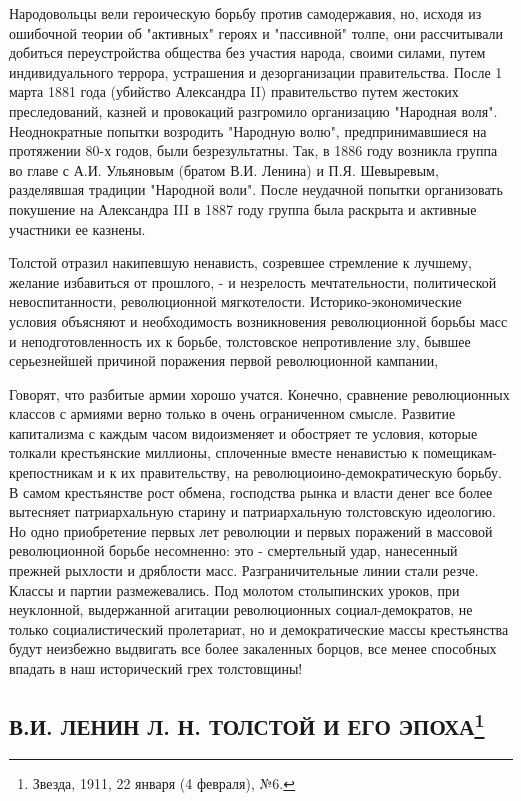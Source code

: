 \documentclass[12pt]{article}
\newcommand{\parnum}{(\arabic{parcount})}
\newcounter{parcount}
\newenvironment{parnumbers}{%
  \par%
  \everypar{\noindent \stepcounter{parcount}\marginpar[]{\parnum}}%
}{}
\begin{document}
\begin{parnumbers}
Народовольцы вели героическую борьбу против самодержавия, но, исходя из ошибочной теории об "активных" героях и "пассивной" толпе, они рассчитывали добиться переустройства общества без участия народа, своими силами, путем индивидуального террора, устрашения и дезорганизации правительства. После 1 марта 1881 года (убийство Александра II) правительство путем жестоких преследований, казней и провокаций разгромило организацию "Народная воля". Неоднократные попытки возродить "Народную волю", предпринимавшиеся на протяжении 80-х годов, были безрезультатны. Так, в 1886 году возникла группа во главе с А.И. Ульяновым (братом В.И. Ленина) и П.Я. Шевыревым, разделявшая традиции "Народной воли". После неудачной попытки организовать покушение на Александра III в 1887 году группа была раскрыта и активные участники ее казнены.

Толстой отразил накипевшую ненависть, созревшее стремление к лучшему, желание избавиться от прошлого, - и незрелость мечтательности, политической невоспитанности, революционной мягкотелости. Историко-экономические условия объясняют и необходимость возникновения революционной борьбы масс и неподготовленность их к борьбе, толстовское непротивление злу, бывшее серьезнейшей причиной поражения первой революционной кампании,

Говорят, что разбитые армии хорошо учатся. Конечно, сравнение революционных классов с армиями верно только в очень ограниченном смысле. Развитие капитализма с каждым часом видоизменяет и обостряет те условия, которые толкали крестьянские миллионы, сплоченные вместе ненавистью к помещикам-крепостникам и к их правительству, на революциоино-демократическую борьбу. В самом крестьянстве рост обмена, господства рынка и власти денег все более вытесняет патриархальную старину и патриархальную толстовскую идеологию. Но одно приобретение первых лет революции и первых поражений в массовой революционной борьбе несомненно: это - смертельный удар, нанесенный прежней рыхлости и дряблости масс. Разграничительные линии стали резче. Классы и партии размежевались. Под молотом столыпинских уроков, при неуклонной, выдержанной агитации революционных социал-демократов, не только социалистический пролетариат, но и демократические массы крестьянства будут неизбежно выдвигать все более закаленных борцов, все менее способных впадать в наш исторический грех толстовщины!
\end{parnumbers}
\subsection{В.И. ЛЕНИН Л. Н. ТОЛСТОЙ И ЕГО ЭПОХА\footnote{Звезда, 1911, 22 января (4 февраля), №6.}}
\end{document}
